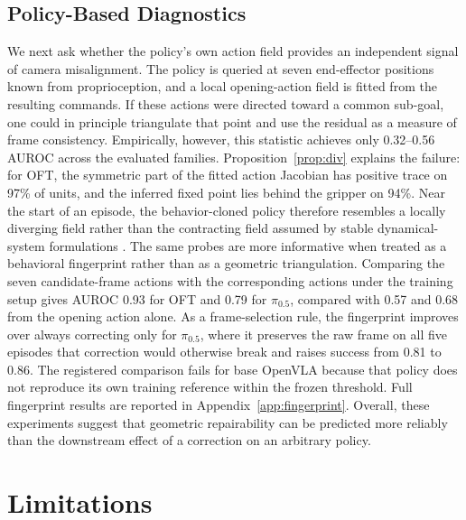 \documentclass{article}
\begin{document}
\subsection{Policy-Based Diagnostics}

\label{sec:policy}

We next ask whether the policy's own action field provides an independent signal of camera misalignment. The policy is
queried at seven end-effector positions known from proprioception, and a local opening-action field is fitted from the
resulting commands. If these actions were directed toward a common sub-goal, one could in principle triangulate that
point and use the residual as a measure of frame consistency. Empirically, however, this statistic achieves only
0.32--0.56 AUROC across the evaluated families. Proposition~\ref{prop:div} explains the failure: for OFT, the symmetric
part of the fitted action Jacobian has positive trace on 97\% of units, and the inferred fixed point lies behind the
gripper on 94\%. Near the start of an episode, the behavior-cloned policy therefore resembles a locally diverging field
rather than the contracting field assumed by stable dynamical-system formulations \citep{ncds}.
The same probes are more informative when treated as a behavioral fingerprint rather than as a geometric
triangulation. Comparing the seven candidate-frame actions with the corresponding actions under the training setup gives
AUROC 0.93 for OFT and 0.79 for $\pi_{0.5}$, compared with 0.57 and 0.68 from the opening action alone. As a
frame-selection rule, the fingerprint improves over always correcting only for $\pi_{0.5}$, where it preserves the raw
frame on all five episodes that correction would otherwise break and raises success from 0.81 to 0.86. The registered
comparison fails for base OpenVLA because that policy does not reproduce its own training reference within the frozen
threshold. Full fingerprint results are reported in Appendix~\ref{app:fingerprint}. Overall, these experiments suggest
that geometric repairability can be predicted more reliably than the downstream effect of a correction on an arbitrary
policy.

\section{Limitations}
\label{sec:limits}
\end{document}
